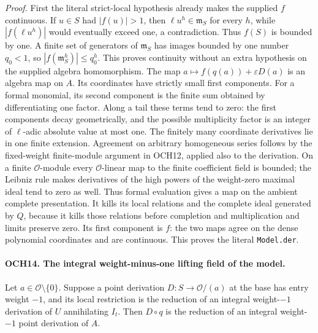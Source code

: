 \documentclass[11pt,a4paper]{article}
\numberwithin{equation}{section}
\theoremstyle{remark}\newtheorem{remark}[theorem]{Remark}
\begin{document}
\emph{Proof.}
First the literal strict-local hypothesis already makes the supplied
\(f\) continuous.  If \(u\in S\) had \(|f(u)|>1\),
then \(\ell u^h\in\mathfrak m_S\) for every \(h\),
while \(|f(\ell u^h)|\) would eventually exceed one, a
contradiction.  Thus \(f(S)\) is bounded by one.  A finite
set of generators of \(\mathfrak m_S\) has images bounded
by one number \(q_0<1\), so
\(|f(\mathfrak m_S^h)|\le q_0^h\).  This proves continuity
without an extra hypothesis on the supplied algebra homomorphism.
The map \(a\mapsto f(q(a))+\varepsilon D(a)\) is an algebra
map on \(A\).  Its coordinates have strictly small first
components.  For a formal monomial, its second component is the
finite sum obtained by differentiating one factor.  Along a tail
these terms tend to zero: the first components decay geometrically,
and the possible multiplicity factor is an integer of
\(\ell\)-adic absolute value at most one.  The finitely many
coordinate derivatives lie in one finite extension.
Agreement on arbitrary homogeneous series follows by the fixed-weight
finite-module argument in OCH12, applied also to the derivation.
On a finite \(\mathcal O\)-module every \(\mathcal O\)-linear
map to the finite coefficient field is bounded; the Leibniz rule
makes derivatives of the high powers of the weight-zero maximal
ideal tend to zero as well.  Thus formal evaluation gives a map
on the ambient complete presentation.  It kills its local relations
and the complete ideal generated by \(Q\), because it kills
those relations before completion and multiplication and limits
preserve zero.  Its first component is \(f\): the two maps
agree on the dense polynomial coordinates and are continuous.
This proves the literal \texttt{Model.\allowbreak der}.

\paragraph{OCH14. The integral weight-minus-one lifting field of the model.}
\label{claim:OCH14}
Let \(a\in\mathcal O\setminus\{0\}\).  Suppose a point
derivation \(D:S\to\mathcal O/(a)\) at the base has entry
weight \(-1\), and its local restriction is the reduction of an
integral weight-\(-1\) derivation of \(U\) annihilating
\(I_t\).  Then \(D\circ q\) is the reduction of an integral
weight-\(-1\) point derivation of \(A\).
\end{document}
